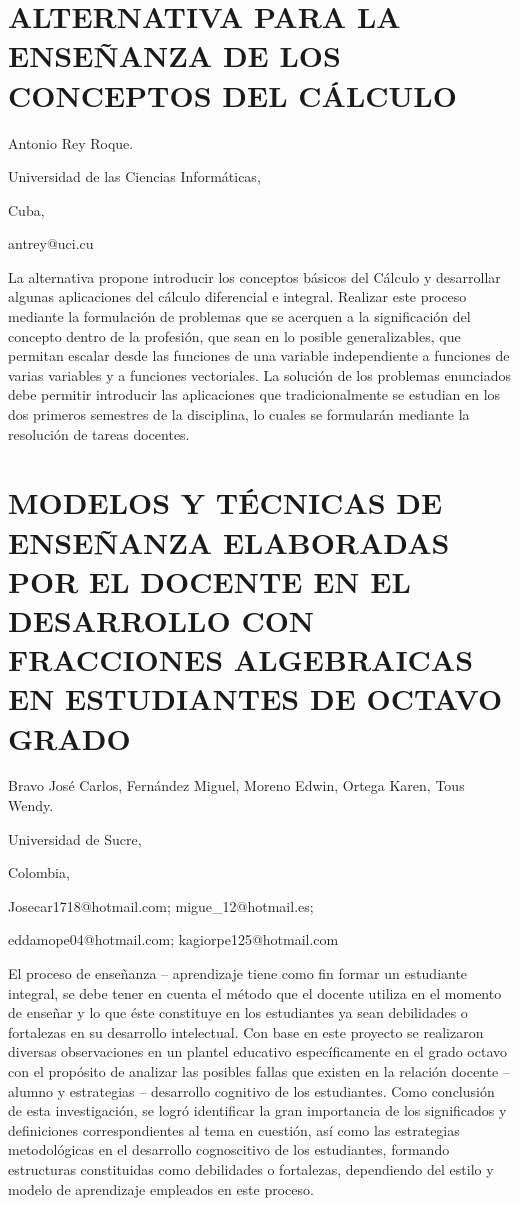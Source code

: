 \section{ALTERNATIVA PARA LA ENSEÑANZA DE LOS CONCEPTOS DEL CÁLCULO }

\begin{datos}

Antonio Rey Roque.

Universidad de las Ciencias Informáticas, 

Cuba,

antrey@uci.cu 

\end{datos}

La alternativa propone introducir los conceptos básicos del Cálculo
y desarrollar algunas aplicaciones del cálculo diferencial e integral.
Realizar este proceso mediante la formulación de problemas que se
acerquen a la significación del concepto dentro de la profesión, que
sean en lo posible generalizables, que permitan escalar desde las
funciones de una variable independiente a funciones de varias variables
y a funciones vectoriales. La solución de los problemas enunciados
debe permitir introducir las aplicaciones que tradicionalmente se
estudian en los dos primeros semestres de la disciplina, lo cuales
se formularán mediante la resolución de tareas docentes. 


\section{MODELOS Y TÉCNICAS DE ENSEÑANZA ELABORADAS POR EL DOCENTE EN EL DESARROLLO
CON FRACCIONES ALGEBRAICAS EN ESTUDIANTES DE OCTAVO GRADO}

\begin{datos}

Bravo José Carlos, Fernández Miguel, Moreno Edwin, Ortega Karen, Tous
Wendy.

Universidad de Sucre,

Colombia,

Josecar1718@hotmail.com; migue\_12@hotmail.es;

eddamope04@hotmail.com; kagiorpe125@hotmail.com

\end{datos}

El proceso de enseñanza – aprendizaje tiene como fin formar un estudiante
integral, se debe tener en cuenta el método que el docente utiliza
en el momento de enseñar y lo que éste constituye en los estudiantes
ya sean debilidades o fortalezas en su desarrollo intelectual. Con
base en este proyecto se realizaron diversas observaciones en un plantel
educativo específicamente en el grado octavo con el propósito de analizar
las posibles fallas que existen en la relación docente –alumno y estrategias
– desarrollo cognitivo de los estudiantes. Como conclusión de esta
investigación, se logró identificar la gran importancia de los significados
y definiciones correspondientes al tema en cuestión, así como las
estrategias metodológicas en el desarrollo cognoscitivo de los estudiantes,
formando estructuras constituidas como debilidades o fortalezas, dependiendo
del estilo y modelo de aprendizaje empleados en este proceso.



